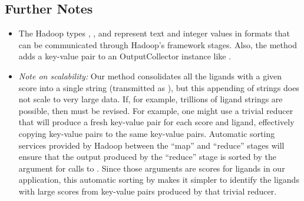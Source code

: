 \documentclass[letterpaper,10pt,openany,oneside]{sphinxmanual}
\begin{document}
\subsection{Further Notes}
\label{hadoop/hadoop:further-notes}\begin{itemize}
\item {} 
The Hadoop types , ,  and  represent text and integer values in formats that can be communicated through Hadoop’s framework stages. Also, the method  adds a key-value pair to an OutputCollector instance like .

\item {} 
\emph{Note on scalability:} Our  method consolidates all the ligands with a given score into a single string (transmitted as ), but this appending of strings does not scale to very large data. If, for example, trillions of ligand strings are possible, then  must be revised. For example, one might use a trivial reducer that will produce a fresh key-value pair for each score and ligand, effectively copying key-value pairs to the same key-value pairs. Automatic sorting services provided by Hadoop between the “map” and “reduce” stages will ensure that the output produced by the “reduce” stage is sorted by the  argument for calls to . Since those  arguments are scores for ligands in our application, this automatic sorting by  makes it simpler to identify the ligands with large scores from key-value pairs produced by that trivial reducer.

\end{itemize}
\end{document}
